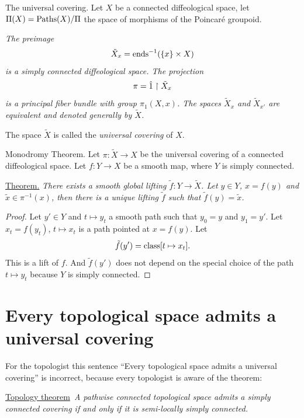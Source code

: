 \begin{Article}{The universal covering.}{}
  Let $X$ be a connected diffeological space,
  let $\Pi(X)= \operatorname{Paths}(X)/\Pi$ the space of morphisms of the Poincaré groupoid.

   {\itshape The preimage
  $$%
  \tilde X_x = \Ends^{-1}(\{x\} \times X)
  $$%
  is a simply connected diffeological space.
  The projection
  $$%
  \pi = \1 \restriction \tilde X_x
  $$%
  is a principal fiber bundle with group $\pi_1(X,x)$.
  The spaces $\tilde X_x$ and $\tilde X_{x'}$ are equivalent and denoted generally by $\tilde X$.
  }

  The space $\tilde X$ is called the \emph{universal covering} of $X$.
\end{Article}

\begin{Article}{Monodromy Theorem.}{}
  Let $\pi \colon \tilde X \to X$ be the universal covering of a connected diffeological space.
  Let $f \colon Y \to X$ be a smooth map,
  where $Y$ is simply connected.

  \uline{Theorem.} {\itshape There exists a smooth global lifting $\tilde f \colon Y \to \tilde X$.
  Let $y \in Y$,
  $x = f(y)$ and $\tilde x \in \pi^{-1}(x)$,
  then there is a unique lifting $\tilde f$ such that $\tilde f(y) = \tilde x$.
  }
\end{Article}

\begin{proof}
Let $y' \in Y$ and $t \mapsto y_t$ a smooth path such that $y_0 = y$ and $y_1 = y'$.
Let $x_t = f(y_t)$,
$t \mapsto x_t$ is a path pointed at $x = f(y)$.
Let
$$%
 \tilde f(y') = \Class[t \mapsto x_t].
$$%
This is a lift of $f$.
And $\tilde f(y')$ does not depend on the special choice of the path $t \mapsto y_t$ because $Y$ is simply connected.
\end{proof}

\section{Every topological space admits a universal covering}

For the topologist this sentence ``Every topological space admits a universal covering'' is incorrect,
because every topologist is aware of the theorem:

\uline{Topology theorem}~{\itshape A pathwise connected topological space admits a simply connected covering if and only if it is semi-locally simply connected.}

